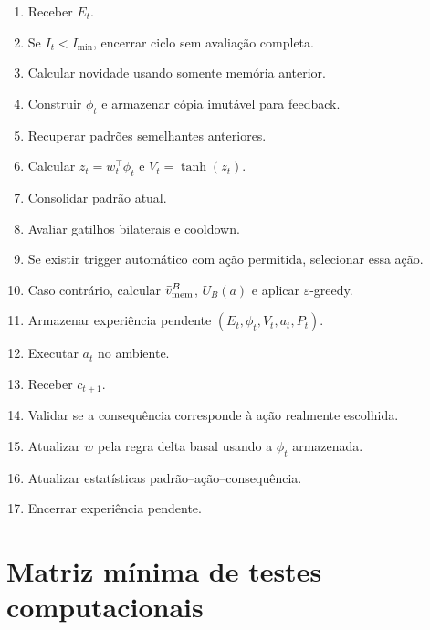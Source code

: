 \begin{enumerate}
\item Receber \(E_t\).
\item Se \(I_t<I_{\min}\), encerrar ciclo sem avaliação completa.
\item Calcular novidade usando somente memória anterior.
\item Construir \(\phi_t\) e armazenar cópia imutável para feedback.
\item Recuperar padrões semelhantes anteriores.
\item Calcular \(z_t=w_t^\top\phi_t\) e \(V_t=\tanh(z_t)\).
\item Consolidar padrão atual.
\item Avaliar gatilhos bilaterais e cooldown.
\item Se existir trigger automático com ação permitida, selecionar essa ação.
\item Caso contrário, calcular \(\bar v_{\rm mem}^{B}\), \(U_B(a)\) e aplicar \(\varepsilon\)-greedy.
\item Armazenar experiência pendente \((E_t,\phi_t,V_t,a_t,P_t)\).
\item Executar \(a_t\) no ambiente.
\item Receber \(c_{t+1}\).
\item Validar se a consequência corresponde à ação realmente escolhida.
\item Atualizar \(w\) pela regra delta basal usando a \(\phi_t\) armazenada.
\item Atualizar estatísticas padrão--ação--consequência.
\item Encerrar experiência pendente.
\end{enumerate}

\section{Matriz mínima de testes computacionais}

